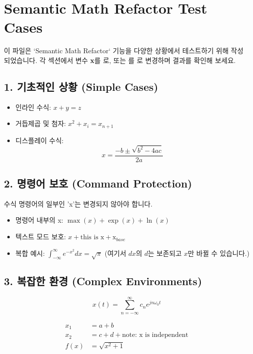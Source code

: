 \documentclass{article}
\begin{document}
\section*{Semantic Math Refactor Test Cases}

이 파일은 `Semantic Math Refactor` 기능을 다양한 상황에서 테스트하기 위해 작성되었습니다.
각 섹션에서 변수 \textbf{x}를 \textbf{\theta}로, 또는 \textbf{\alpha}를 \textbf{\gamma}로 변경하며 결과를 확인해 보세요.

\subsection{1. 기초적인 상황 (Simple Cases)}
\begin{itemize}
    \item 인라인 수식: $x + y = z$
    \item 거듭제곱 및 첨자: $x^2 + x_i = x_{n+1}$
    \item 디스플레이 수식:
    \[ x = \frac{-b \pm \sqrt{b^2 - 4ac}}{2a} \]
\end{itemize}

\subsection{2. 명령어 보호 (Command Protection)}
수식 명령어의 일부인 'x'는 변경되지 않아야 합니다.
\begin{itemize}
    \item 명령어 내부의 x: $\max(x) + \exp(x) + \ln(x)$
    \item 텍스트 모드 보호: $x + \text{this is x} + \mathrm{x}_{base}$
    \item 복합 예시: $\int_{-\infty}^{\infty} e^{-x^2} dx = \sqrt{\pi}$ (여기서 $dx$의 $d$는 보존되고 $x$만 바뀔 수 있습니다.)
\end{itemize}

\subsection{3. 복잡한 환경 (Complex Environments)}
\begin{equation}
    x(t) = \sum_{n=-\infty}^{\infty} c_n e^{j n \omega_0 t}
\end{equation}

\begin{align}
    x_1 &= a + b \\
    x_2 &= c + d + \text{note: x is independent} \\
    f(x) &= \sqrt{x^2 + 1}
\end{align}
\end{document}
